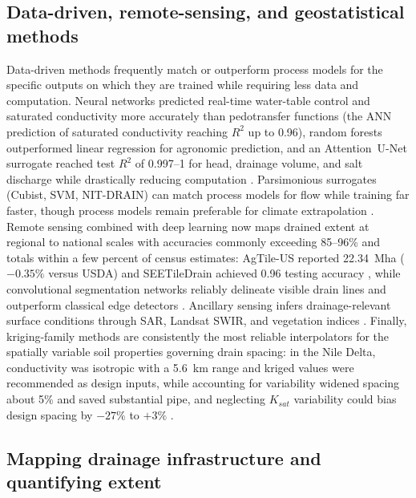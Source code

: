 \documentclass[11pt]{article}
\begin{document}
\subsection{Data-driven, remote-sensing, and geostatistical methods}

Data-driven methods frequently match or outperform process models for the
specific outputs on which they are trained while requiring less data and
computation. Neural networks predicted real-time water-table control and
saturated conductivity more accurately than pedotransfer functions
(the ANN prediction of saturated conductivity reaching $R^2$ up to 0.96),
random forests outperformed linear regression
for agronomic prediction, and an Attention~U-Net surrogate reached test $R^2$
of 0.997--1 for head, drainage volume, and salt discharge while drastically
reducing computation
\parencite{Yang2000,Ellafi2021,Djiemon2019,Lei2026,Sarangi2006,Bakhsh2005b,Bakhsh2007b}.
Parsimonious surrogates (Cubist, SVM, NIT-DRAIN) can match process models for
flow while training far faster, though process models remain preferable for
climate extrapolation
\parencite{Sharma2003,Negm2016,Frederiksen2023,Chelil2022,Li2025}. Remote
sensing combined with deep learning now maps drained extent at regional to
national scales with accuracies commonly exceeding 85--96\% and totals within a
few percent of census estimates: AgTile-US reported 22.34~Mha ($-0.35\%$ versus
USDA) and SEETileDrain achieved 0.96 testing accuracy
\parencite{Valayamkunnath2020,Wan2024,Moller2018}, while convolutional
segmentation networks reliably delineate visible drain lines and outperform
classical edge detectors \parencite{Redoloza2023,Song2021,Woo2023,Naz2009}.
Ancillary sensing infers drainage-relevant surface conditions through SAR,
Landsat SWIR, and vegetation indices
\parencite{Meunier2001,Rijal2013,Xu2018,Khanal2020}. Finally, kriging-family
methods are consistently the most reliable interpolators for the spatially
variable soil properties governing drain spacing: in the Nile Delta,
conductivity was isotropic with a 5.6~km range and kriged values were
recommended as design inputs, while accounting for variability widened spacing
about 5\% and saved substantial pipe, and neglecting $K_{sat}$ variability
could bias design spacing by $-27\%$ to $+3\%$
\parencite{GALLICHAND1991,GALLICHAND1992,GALLICHAND1993,Moustafa1998b,Moustafa2000,Moustafa1998,Akis2015,Sepaskhah2004}.

\subsection{Mapping drainage infrastructure and quantifying extent}
\end{document}
